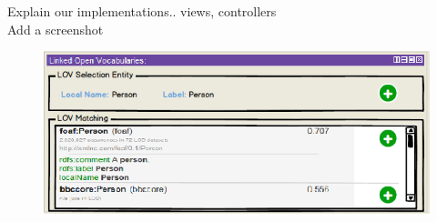 Explain our implementations.. views, controllers\\
Add a screenshot

\begin{figure}
\center
\includegraphics[scale=0.7]{img/LOVmockup.png}
\end{figure}

